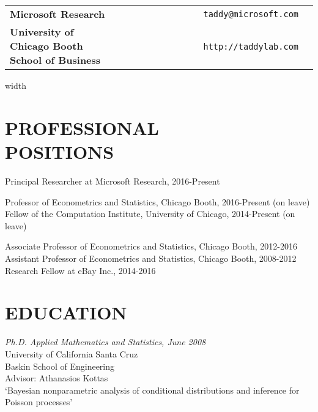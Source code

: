 \documentclass[margin,line]{res}
\begin{document}

\begin{resume}

\medskip
\section{} 
\vspace{.05in}
\begin{tabular}{@{}p{3in}rp{2in}}
{\bf Microsoft Research} & {\tt taddy@microsoft.com}\\
{\bf University of Chicago Booth School of Business} & ~~~~~~~~~~~~~~~~~{\tt http://taddylab.com}
\end{tabular}



\vspace{.5cm}
\leaders\vrule width \textwidth\vskip0.4pt

\medskip
\section{\bf PROFESSIONAL\\ POSITIONS}

Principal Researcher at Microsoft Research, 2016-Present

\vspace{-.2cm}
Professor of Econometrics and Statistics, Chicago Booth,
2016-Present (on leave)\\
Fellow of the Computation Institute, University of Chicago, 2014-Present (on leave)

\vspace{-.2cm}
Associate Professor of Econometrics and Statistics, Chicago Booth,
2012-2016\\
Assistant Professor of Econometrics and Statistics, Chicago Booth,
2008-2012\\
Research Fellow at eBay Inc., 2014-2016

\medskip
\section{\bf EDUCATION}

{\it Ph.D. Applied Mathematics and Statistics, June 2008}\\
{\sc University of California Santa Cruz}\\
Baskin School of Engineering\\
Advisor: Athanasios Kottas\\
`Bayesian nonparametric analysis of conditional distributions and inference for Poisson processes'


\end{resume}
\end{document}

